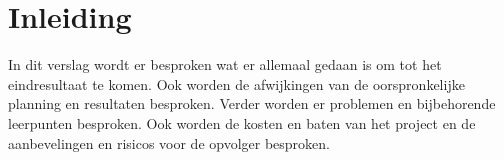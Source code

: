 \section{Inleiding}
In dit verslag wordt er besproken wat er allemaal gedaan is om tot het eindresultaat te komen. Ook worden de afwijkingen van de oorspronkelijke planning en resultaten besproken. Verder worden er problemen en bijbehorende leerpunten besproken. Ook worden de kosten en baten van het project en de aanbevelingen en risicos voor de opvolger besproken.